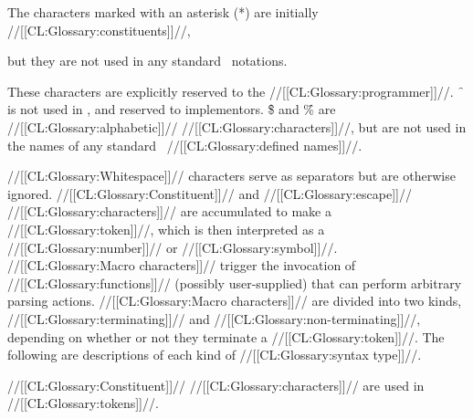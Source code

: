 {\def\w{//[[CL:Glossary:whitespace]]//\meaning{2}} \def\n{//[[CL:Glossary:non-terminating]]// //[[CL:Glossary:macro char]]//} %

The characters marked with an asterisk (*) are initially //[[CL:Glossary:constituents]]//,

but they are not used in any standard \clisp\ notations.

These characters are explicitly reserved to the //[[CL:Glossary:programmer]]//. \f{~} is not used in \clisp, and reserved to implementors. \f{\$} and \f{\%} are //[[CL:Glossary:alphabetic]]// //[[CL:Glossary:characters]]//, but are not used in the names of any standard \clisp\ //[[CL:Glossary:defined names]]//.

//[[CL:Glossary:Whitespace]]// characters serve as separators but are otherwise ignored.  //[[CL:Glossary:Constituent]]// and //[[CL:Glossary:escape]]// //[[CL:Glossary:characters]]// are accumulated to make a //[[CL:Glossary:token]]//, which is then interpreted as a //[[CL:Glossary:number]]// or //[[CL:Glossary:symbol]]//. //[[CL:Glossary:Macro characters]]// trigger the invocation of //[[CL:Glossary:functions]]// (possibly user-supplied) that can perform arbitrary parsing actions. //[[CL:Glossary:Macro characters]]// are divided into two kinds, //[[CL:Glossary:terminating]]// and //[[CL:Glossary:non-terminating]]//, depending on whether or not they terminate a //[[CL:Glossary:token]]//. The following are descriptions of each kind of //[[CL:Glossary:syntax type]]//.

 

//[[CL:Glossary:Constituent]]// //[[CL:Glossary:characters]]// are used in //[[CL:Glossary:tokens]]//.

}
